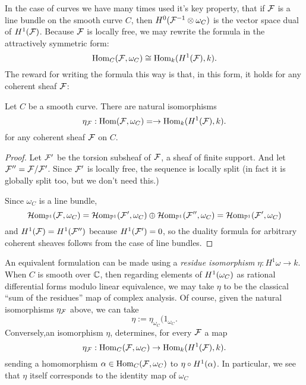 In the case of curves  we have many times used it's key property, that if  $\cF$  is a line bundle on the smooth curve  $C$, then $\HH^{0}(\sF^{-1}\otimes \omega_{C})$ is the vector space dual of $\HH^{1}(\cF)$. Because $\sF$ is locally free, we may rewrite the formula in the attractively symmetric form:
$$
\Hom_{C}(\sF, \omega_{C})
\cong 
\Hom_{k}(\HH^{1}(\cF), k).
$$
The reward for writing the formula this way is that, in this form, 
it holds for any coherent sheaf $\cF$:

\begin{proposition} Let $C$ be a smooth curve.
There are natural isomorphisms
$$
\eta_{\sF}: \Hom(\sF,\omega_{C}) =  
\to 
\Hom_{k}(\HH^{1}(\cF), k).
$$
for any coherent sheaf $\cF$ on $C$.
\end{proposition}

\begin{proof}
 Let $\cF'$ be the torsion subsheaf  of $\cF$, a sheaf of finite support. And let
 $\cF'' = \cF/\cF'$.
 Since
$\cF'$ is locally free, the sequence is locally split (in fact it is globally split too, but we don't need this.)

Since $\omega_{C}$ is a line bundle, 
$$
\sHom_{\PP^1}(\sF, \omega_{C}) = 
\sHom_{\PP^1}(\sF', \omega_{C}) \oplus \sHom_{\PP^1}(\sF'', \omega_{C})  = 
\sHom_{\PP^1}(\sF', \omega_{C}) 
$$
and 
$\HH^{1}(\cF) = \HH^{1}(\cF'')
$
because $\HH^{1}(\cF') = 0$, so the duality formula for arbitrary coherent sheaves follows from the case of line bundles.
\end{proof}

An equivalent formulation can be made using a \emph{residue isomorphism} $\eta: H^{1}\omega \to k$. When $C$ is smooth over $\CC$, then regarding elements of 
$\HH^{1}(\omega_{C})$ as rational differential forms modulo linear equivalence,
we may take $\eta$ to be the classical ``sum of the residues'' map of complex analysis.
Of course, given the natural isomorphisms $\eta_{\sF}$ above, we can take
$$
\eta := \eta_{\omega_{C}}(1_{\omega_{C}}.
$$ Conversely,an isomorphism $\eta$, 
determines, for every $\sF$ a map
$$
\eta_{\sF}:\Hom_{C}(\sF, \omega_{C})
\to
\Hom_{k}(\HH^{1}(\cF), k).
$$
sending a homomorphism
$\alpha \in \Hom_{C}(\sF, \omega_{C}) $
to $\eta \circ \HH^{1}(\alpha)$. In particular, we see that $\eta$ itself corresponds to the 
identity map of $\omega_{C}$  

%

